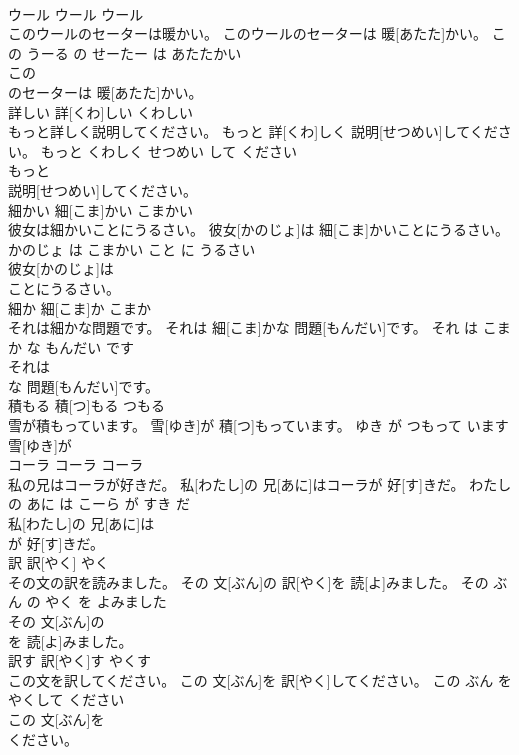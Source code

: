 \documentclass[8pt]{extreport}
\begin{document}
\begin{CJK}{UTF8}{min}
\\	ウール	ウール	ウール	
\\	このウールのセーターは暖かい。	このウールのセーターは 暖[あたた]かい。	この うーる の せーたー は あたたかい	
\\	この
\\	のセーターは 暖[あたた]かい。			
\\	詳しい	詳[くわ]しい	くわしい	
\\	もっと詳しく説明してください。	もっと 詳[くわ]しく 説明[せつめい]してください。	もっと くわしく せつめい して ください	
\\	もっと
\\	説明[せつめい]してください。			
\\	細かい	細[こま]かい	こまかい	
\\	彼女は細かいことにうるさい。	彼女[かのじょ]は 細[こま]かいことにうるさい。	かのじょ は こまかい こと に うるさい	
\\	彼女[かのじょ]は
\\	ことにうるさい。			
\\	細か	細[こま]か	こまか	
\\	それは細かな問題です。	それは 細[こま]かな 問題[もんだい]です。	それ は こまか な もんだい です	
\\	それは
\\	な 問題[もんだい]です。			
\\	積もる	積[つ]もる	つもる	
\\	雪が積もっています。	雪[ゆき]が 積[つ]もっています。	ゆき が つもって います	
\\	雪[ゆき]が
\\	コーラ	コーラ	コーラ	
\\	私の兄はコーラが好きだ。	私[わたし]の 兄[あに]はコーラが 好[す]きだ。	わたし の あに は こーら が すき だ	
\\	私[わたし]の 兄[あに]は
\\	が 好[す]きだ。			
\\	訳	訳[やく]	やく	
\\	その文の訳を読みました。	その 文[ぶん]の 訳[やく]を 読[よ]みました。	その ぶん の やく を よみました	
\\	その 文[ぶん]の
\\	を 読[よ]みました。			
\\	訳す	訳[やく]す	やくす	
\\	この文を訳してください。	この 文[ぶん]を 訳[やく]してください。	この ぶん を やくして ください	
\\	この 文[ぶん]を
\\	ください。			

\end{CJK}
\end{document}
